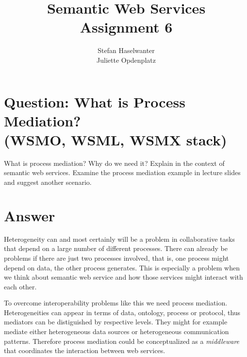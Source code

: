 \documentclass[a4paper]{article}
\title{\textbf{Semantic Web Services}\\\large{Assignment 6}}
\author{Stefan Haselwanter\\Juliette Opdenplatz}
\begin{document}
\maketitle

\section{Question: What is Process Mediation?\\(WSMO, WSML, WSMX stack)}

What is process mediation? Why do we need it? Explain in the context of
semantic web services. Examine the process mediation example in lecture slides
and suggest another scenario.

\section{Answer}

Heterogeneity can and most certainly will be a problem in collaborative tasks 
that depend on a large number of different processes.
There can already be problems if there are just two processes involved, 
that is, one process might depend on data, the other process generates.
This is especially a problem when we think about semantic web service
and how those services might interact with each other.

To overcome interoperability problems like this we need process mediation. 
Heterogeneities can appear in terms of data, ontology, process or protocol,
thus mediators can be distiguished by respective levels.
They might for example mediate either heterogeneous data sources 
or heterogeneous communication patterns.
Therefore process mediation could be conceptualized
as a {\em middleware} that coordinates the
interaction between web services.
\end{document}
